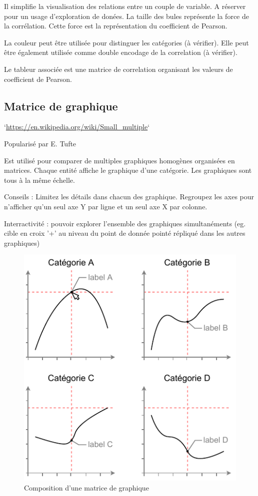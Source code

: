 \documentclass[a4paper,12pt]{article}
\begin{document}
\begin{multicols}{2}
Il simplifie la visualisation des relations entre un couple de variable. A réserver pour un usage d'exploration de donées. \autocite{sosulskiGraphics2019} La taille des bules représente la force de la corrélation. Cette force est la représentation du coefficient de Pearson. \autocite{jonathanschwabishRelationship2021}

La couleur peut être utilisée pour distinguer les catégories (à vérifier). Elle peut être également utilisée comme double encodage de la correlation (à vérifier).

Le tableur associée est une matrice de correlation organisant les valeurs de coefficient de Pearson.
\subsection*{Matrice de graphique}
\label{sec:org10b09f5}
`\url{https://en.wikipedia.org/wiki/Small\_multiple}`

Popularisé par E. Tufte

Est utilisé pour comparer de multiples graphiques homogènes organisées en matrices. Chaque entité affiche le graphique d'une catégorie. Les graphiques sont tous à la même échelle. \autocite{sosulskiGraphics2019}

Conseils : Limitez les détails dans chacun des graphique. \autocite{sosulskiGraphics2019} Regroupez les axes pour n'afficher qu'un seul axe Y par ligne et un seul axe X par colonne.

Interractivité : pouvoir explorer l'ensemble des graphiques simultanéments (eg. cible en croix '+' au niveau du point de donnée pointé répliqué dans les autres graphiques)

\begin{figure}[H]
\centering
\includegraphics[width=.9\linewidth]{./img/small-multiple.pdf}
\caption{\label{fig:org12715bd}Composition d'une matrice de graphique}
\end{figure}

\end{multicols}
\end{document}
